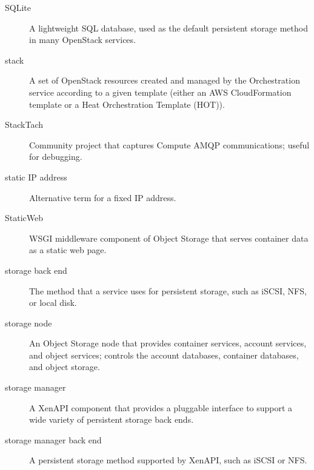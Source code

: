 \documentclass[letterpaper,10pt,english]{sphinxmanual}
\begin{document}
\begin{description}
\item[{SQLite}] \leavevmode{}\label{_source/glossary:term-sqlite}
A lightweight SQL database, used as the default persistent
storage method in many OpenStack services.

\item[{stack}] \leavevmode{}\label{_source/glossary:term-stack}
A set of OpenStack resources created and managed by the
Orchestration service according to a given template (either an
AWS CloudFormation template or a Heat Orchestration
Template (HOT)).

\item[{StackTach}] \leavevmode{}\label{_source/glossary:term-stacktach}
Community project that captures Compute AMQP communications;
useful for debugging.

\item[{static IP address}] \leavevmode{}\label{_source/glossary:term-static-ip-address}
Alternative term for a fixed IP address.

\item[{StaticWeb}] \leavevmode{}\label{_source/glossary:term-staticweb}
WSGI middleware component of Object Storage that serves
container data as a static web page.

\item[{storage back end}] \leavevmode{}\label{_source/glossary:term-storage-back-end}
The method that a service uses for persistent storage, such as
iSCSI, NFS, or local disk.

\item[{storage node}] \leavevmode{}\label{_source/glossary:term-storage-node}
An Object Storage node that provides container services, account
services, and object services; controls the account databases,
container databases, and object storage.

\item[{storage manager}] \leavevmode{}\label{_source/glossary:term-storage-manager}
A XenAPI component that provides a pluggable interface to
support a wide variety of persistent storage back ends.

\item[{storage manager back end}] \leavevmode{}\label{_source/glossary:term-storage-manager-back-end}
A persistent storage method supported by XenAPI, such as iSCSI
or NFS.


\end{description}
\end{document}

